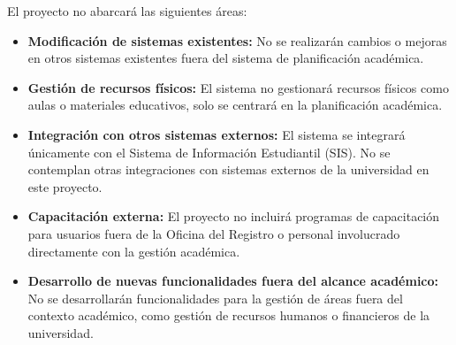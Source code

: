 El proyecto no abarcará las siguientes áreas:
\begin{itemize}
    \item \textbf{Modificación de sistemas existentes:} No se realizarán cambios o mejoras en otros sistemas existentes fuera del sistema de planificación académica.
    \item \textbf{Gestión de recursos físicos:} El sistema no gestionará recursos físicos como aulas o materiales educativos, solo se centrará en la planificación académica.
    \item \textbf{Integración con otros sistemas externos:} El sistema se integrará únicamente con el Sistema de Información Estudiantil (SIS). No se contemplan otras integraciones con sistemas externos de la universidad en este proyecto.
    \item \textbf{Capacitación externa:} El proyecto no incluirá programas de capacitación para usuarios fuera de la Oficina del Registro o personal involucrado directamente con la gestión académica.
    \item \textbf{Desarrollo de nuevas funcionalidades fuera del alcance académico:} No se desarrollarán funcionalidades para la gestión de áreas fuera del contexto académico, como gestión de recursos humanos o financieros de la universidad.
\end{itemize}

